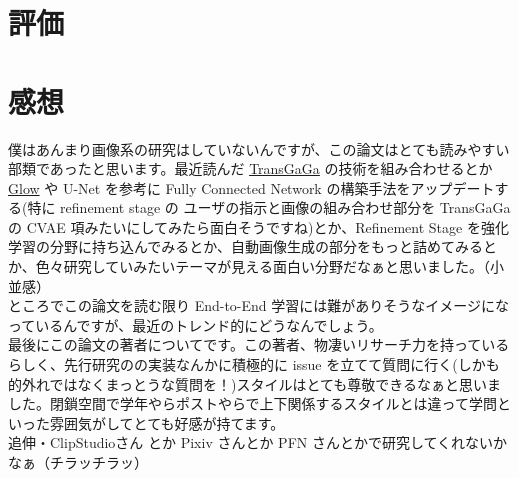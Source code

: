\documentclass[a4paper, dvipdfmx, 10pt]{article}
\begin{document}
\section{評価}
\label{sec:org8e20244}
\section{感想}
\label{sec:org259132b}
僕はあんまり画像系の研究はしていないんですが、この論文はとても読みやすい部類であったと思います。最近読んだ \href{https://arxiv.org/abs/1904.09571}{TransGaGa} の技術を組み合わせるとか \href{https://arxiv.org/abs/1807.03039}{Glow} や U-Net を参考に Fully Connected Network の構築手法をアップデートする(特に refinement stage の ユーザの指示と画像の組み合わせ部分を TransGaGa の CVAE 項みたいにしてみたら面白そうですね)とか、Refinement Stage を強化学習の分野に持ち込んでみるとか、自動画像生成の部分をもっと詰めてみるとか、色々研究していみたいテーマが見える面白い分野だなぁと思いました。（小並感）\\

ところでこの論文を読む限り End-to-End 学習には難がありそうなイメージになっているんですが、最近のトレンド的にどうなんでしょう。\\

最後にこの論文の著者についてです。この著者、物凄いリサーチ力を持っているらしく、先行研究のの実装なんかに積極的に issue を立てて質問に行く(しかも的外れではなくまっとうな質問を！)スタイルはとても尊敬できるなぁと思いました。閉鎖空間で学年やらポストやらで上下関係するスタイルとは違って学問といった雰囲気がしてとても好感が持てます。\\

追伸・ClipStudioさん とか Pixiv さんとか PFN さんとかで研究してくれないかなぁ（チラッチラッ）\\
\end{document}
